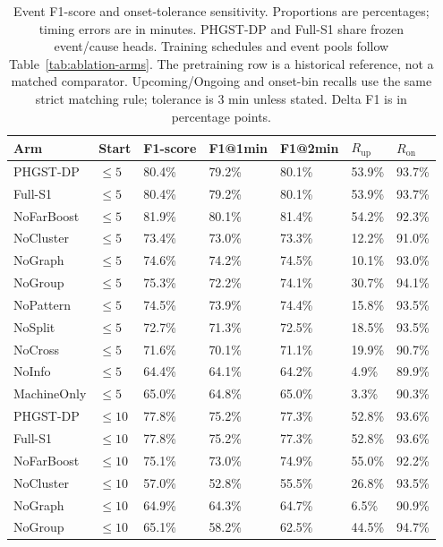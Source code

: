 \begin{table}[p]
\centering
\scriptsize
\setlength{\tabcolsep}{3pt}
\renewcommand{\arraystretch}{1.12}
\caption{Event F1-score and onset-tolerance sensitivity. Proportions are percentages; timing errors are in minutes. PHGST-DP and Full-S1 share frozen event/cause heads. Training schedules and event pools follow Table~\ref{tab:ablation-arms}. The pretraining row is a historical reference, not a matched comparator. Upcoming/Ongoing and onset-bin recalls use the same strict matching rule; tolerance is 3 min unless stated. Delta F1 is in percentage points.}
\label{tab:complete-1-2}
\begin{tabularx}{\textwidth}{@{}lXXXXXX@{}}
\toprule
Arm & Start & F1-score & F1@1min & F1@2min & $R_{\mathrm{up}}$ & $R_{\mathrm{on}}$ \\
\midrule
PHGST-DP & $\le 5$ & 80.4\% & 79.2\% & 80.1\% & 53.9\% & 93.7\% \\
Full-S1 & $\le 5$ & 80.4\% & 79.2\% & 80.1\% & 53.9\% & 93.7\% \\
NoFarBoost & $\le 5$ & 81.9\% & 80.1\% & 81.4\% & 54.2\% & 92.3\% \\
NoCluster & $\le 5$ & 73.4\% & 73.0\% & 73.3\% & 12.2\% & 91.0\% \\
NoGraph & $\le 5$ & 74.6\% & 74.2\% & 74.5\% & 10.1\% & 93.0\% \\
NoGroup & $\le 5$ & 75.3\% & 72.2\% & 74.1\% & 30.7\% & 94.1\% \\
NoPattern & $\le 5$ & 74.5\% & 73.9\% & 74.4\% & 15.8\% & 93.5\% \\
NoSplit & $\le 5$ & 72.7\% & 71.3\% & 72.5\% & 18.5\% & 93.5\% \\
NoCross & $\le 5$ & 71.6\% & 70.1\% & 71.1\% & 19.9\% & 90.7\% \\
NoInfo & $\le 5$ & 64.4\% & 64.1\% & 64.2\% & 4.9\% & 89.9\% \\
MachineOnly & $\le 5$ & 65.0\% & 64.8\% & 65.0\% & 3.3\% & 90.3\% \\
\midrule
PHGST-DP & $\le 10$ & 77.8\% & 75.2\% & 77.3\% & 52.8\% & 93.6\% \\
Full-S1 & $\le 10$ & 77.8\% & 75.2\% & 77.3\% & 52.8\% & 93.6\% \\
NoFarBoost & $\le 10$ & 75.1\% & 73.0\% & 74.9\% & 55.0\% & 92.2\% \\
NoCluster & $\le 10$ & 57.0\% & 52.8\% & 55.5\% & 26.8\% & 93.5\% \\
NoGraph & $\le 10$ & 64.9\% & 64.3\% & 64.7\% & 6.5\% & 90.9\% \\
NoGroup & $\le 10$ & 65.1\% & 58.2\% & 62.5\% & 44.5\% & 94.7\% \\

\end{tabularx}
\end{table}
